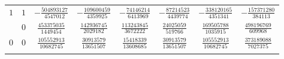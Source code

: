 \begin{table}
\begin{center}
\begin{tabular}{cccccccc}
      $1$  &  $1$  &  $-\frac{ 504893127}{ 4547012}$  &  $-\frac{ 109600459}{ 4359925}$  &  $-\frac{  74146214}{ 6413969}$  &  $-\frac{  87214523}{ 4439774}$  &  $-\frac{ 338120165}{ 4351341}$  &  $-\frac{ 157371280}{  384113}$  \\ \addlinespace
           &  $0$  &  $ \frac{ 453375035}{ 1449454}$  &  $ \frac{ 142936745}{ 2029182}$  &  $ \frac{ 113243845}{ 3672222}$  &  $ \frac{  24025059}{  519766}$  &  $ \frac{ 169505788}{ 1035915}$  &  $ \frac{ 498196769}{  609968}$  \\ \addlinespace
      $0$  &  $0$  &  $ \frac{ 105552913}{10682745}$  &  $ \frac{  30913579}{13651507}$  &  $ \frac{  15418339}{13608685}$  &  $ \frac{  30913579}{13651507}$  &  $ \frac{ 105552913}{10682745}$  &  $ \frac{ 373189088}{ 7027375}$  \\ \addlinespace
      \bottomrule
    \end{tabular}
  \end{center}
\end{table}

